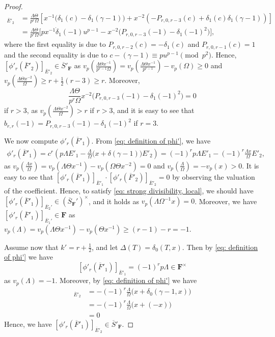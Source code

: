 \documentclass[11pt]{amsart}
\theoremstyle{definition}
\numberwithin{equation}{subsection}
\theoremstyle{plain}
\theoremstyle{plain}
\theoremstyle{plain}
\theoremstyle{plain}
\theoremstyle{plain}
\theoremstyle{plain}
\theoremstyle{plain}
\theoremstyle{plain}
\theoremstyle{plain}
\theoremstyle{plain}
\theoremstyle{plain}
\theoremstyle{plain}
\theoremstyle{definition}
\theoremstyle{definition}
\theoremstyle{definition}
\theoremstyle{remark}
\renewcommand{\(}{\textup{(}}
\renewcommand{\)}{\textup{)}}
\newcommand{\F}{\mathbf{F}}
\newcommand{\barS}{\overline{S}}
\newcommand{\barE}{\overline{E}}
\newcommand{\barF}{\overline{F}}
\begin{document}
\begin{proof}
\begin{align*}
[\phi'_r(\barF'_{2})]_{\barE'_2}&=\frac{\Lambda\Theta}{p^r\Omega} \left[x^{-1}\big(\delta_1(c)-\delta_1(\gamma-1)\big)+x^{-2}(-P_{r,0,r-3}(c)+\delta_1(c)\delta_1(\gamma-1))\right]\\
&=\frac{\Lambda\Theta}{p^r\Omega} \big[px^{-1}\dot{\delta}_1(-1)u^{p-1}-x^{-2}\big(P_{r,0,r-3}(-1)-\delta_1(-1)^2\big)\big],
\end{align*}
where the first equality is due to $P_{r,0,r-2}(c)=-\delta_1(c)$ and $P_{r,0,r-1}(c)=1$ and the second equality is due to $c-(\gamma-1)\equiv pu^{p-1}\pmod{p^2}$.
Hence, $[\phi'_r(\barF'_{2})]_{\barE'_2}\in\barS'_\F$ as 
$v_p(\frac{\Lambda\Theta x^{-1}}{p^{r-1}\Omega})=v_p(\frac{\Lambda\Theta x^{-1}}{p^{r-1}})-v_p(\Omega)\geq 0$ and 
$v_p(\frac{\Lambda\Theta x^{-2}}{\Omega})\geq r+\frac{1}{2}(r-3)\geq r$. Moreover,
$$\frac{\Lambda\Theta}{p^r\Omega}x^{-2}\big(P_{r,0,r-3}(-1)-\delta_1(-1)^2\big)=0$$
if $r>3$, as $v_p(\frac{\Lambda\Theta x^{-2}}{\Omega})>r$ if $r>3$, and it is easy to see that $b_{r,r}(-1)=P_{r,0,r-3}(-1)-\delta_1(-1)^2$ if $r=3$.

We now compute $\phi'_r(\barF'_1)$. From \eqref{eq: definition of phi'}, we have
\begin{align*}
\phi'_r(\barF'_1)=c^r\left(p\Lambda E'_1-\frac{\Lambda}{\Omega}\big(x+\delta(\gamma-1)\big)E'_2\right)=(-1)^rp\Lambda E'_1-(-1)^r\frac{\Lambda x}{\Omega}E'_2,
\end{align*}
as $v_p(\frac{\Lambda x}{\Omega})=v_p(\Lambda\Theta x^{-1})-v_p(\Omega\Theta x^{-2})=0$ and $v_p(\frac{\Lambda}{\Omega})=-v_p(x)>0$. It is easy to see that $[\phi'_r(\barF'_1)]_{\barE'_1}\cdot [\phi'_r(\barF'_2)]_{\barE'_2}=0$ by observing the valuation of the coefficient.
Hence, to satisfy \eqref{eq: strong divisibility, local}, we should have $[\phi'_r(\barF'_1)]_{\barE_2'}\in (\barS_\F')^\times$, and it holds as $v_p(\Lambda\Omega^{-1}x)=0$. Moreover, we have $[\phi'_r(\barF'_1)]_{\barE_1'}\in \F$ as $v_p(\Lambda)=v_p(\Lambda\Theta x^{-1})-v_p(\Theta x^{-1})\geq (r-1) -r=-1$.




Assume now that $k'=r+\frac{1}{2}$, and let $\Delta(T)=\delta_0(T,x)$. Then by \eqref{eq: definition of phi'} we have $$[\phi'_r(\barF'_1)]_{\barE'_1}=(-1)^rp\Lambda\in\F^\times$$ as $v_p(\Lambda)=-1$. Moreover, by \eqref{eq: definition of phi'} we have
\begin{align*}
[\phi'_r(\barF'_1)]_{\barE'_2}&=-(-1)^r\frac{\Lambda}{\Omega} \big(x+\delta_0(\gamma-1,x)\big)\\
&=-(-1)^r\frac{\Lambda}{\Omega}\big(x+(-x)\big)\\
&=0
\end{align*}
Hence, we have $[\phi'_r(\barF'_1)]_{\barE'_2}\in\barS'_\F$.


\end{proof}
\end{document}
